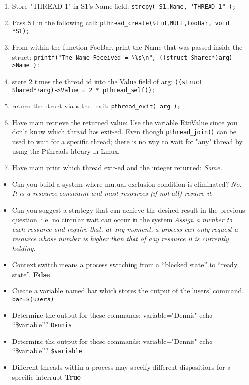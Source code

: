 \documentclass[10pt,landscape]{article}
\begin{document}
\begin{multicols}{4}
\begin{enumerate}
    \item Store "THREAD 1" in S1's Name field:  \verb$strcpy( S1.Name, "THREAD 1" );$
    \item Pass S1 in the following call:  \verb$pthread_create(&tid,NULL,FooBar, void *S1);$
    \item From within the function FooBar, print the Name that was passed inside the struct:  \verb$printf("The Name Received = \%s\n", ((struct Shared*)arg)->Name );$
    \item store 2 times the thread id into the Value field of arg:  \verb$((struct Shared*)arg)->Value = 2 * pthread_self();$
    \item return the struct via a thr\_exit: \verb$pthread_exit( arg );$
    \item Have main retrieve the returned value:  Use the variable RtnValue since you don't know which thread has exit-ed. Even though \verb$pthread_join()$ can be used to wait for a specific thread; there is no way to wait for "any" thread by using the Pthreads library in Linux.
    \item Have main print which thread exit-ed and the integer returned: \textit{Same.}
\end{enumerate}
\hfill
\begin{itemize}
    \item Can you build a system where mutual exclusion condition is eliminated?  \textit{No. It is a resource constraint and most resources (if not all) require it.}
    \item Can you suggest a strategy that can achieve the desired result in the previous question, i.e. no circular wait can occur in the system \textit{Assign a number to each resource and require that, at any moment, a process can only request a resource whose number is higher than that of any resource it is currently holding.}
    \item Context switch means a process switching from a ``blocked state'' to ``ready state''.  \textbf{False}
    \item Create a variable named bar which stores the output of the 'users' command. \verb|bar=$(users)|
    \item Determine the output for these commands: variable="Dennis" echo ``\$variable''? \verb$Dennis$
    \item Determine the output for these commands: variable="Dennis" echo ``\$variable''? \verb|$variable|
    \item Different threads within a process may specify different dispositions for a specific interrupt \textbf{True}

\end{itemize}
\end{multicols}
\end{document}
